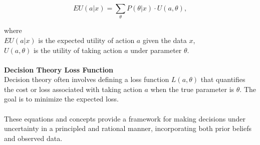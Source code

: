 \documentclass[12pt]{report}
\begin{document}
\begin{equation}
    EU(a | x) = \sum_{\theta} P(\theta | x) \cdot U(a, \theta),
\end{equation}

\noindent where\\
\( EU(a | x) \) is the expected utility of action \( a \) given the data \( x \),\\
\( U(a, \theta) \) is the utility of taking action \( a \) under parameter \( \theta \).\\
\\
\textbf{Decision Theory Loss Function}\\
Decision theory often involves defining a loss function \( L(a, \theta) \) that quantifies
the cost or loss associated with taking action \( a \) when the true parameter
is \( \theta \). The goal is to minimize the expected loss.\\
\\
These equations and concepts provide a framework for making decisions under uncertainty
in a principled and rational manner, incorporating both prior beliefs and observed data.
\end{document}
